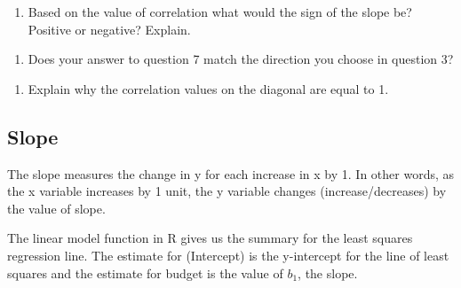 \documentclass[
]{report}
\newenvironment{Shaded}{\begin{snugshade}}{\end{snugshade}}
\newcommand{\CommentTok}[1]{\textcolor[rgb]{0.56,0.35,0.01}{\textit{#1}}}
\newcommand{\DataTypeTok}[1]{\textcolor[rgb]{0.13,0.29,0.53}{#1}}
\newcommand{\KeywordTok}[1]{\textcolor[rgb]{0.13,0.29,0.53}{\textbf{#1}}}
\newcommand{\NormalTok}[1]{#1}
\newcommand{\OperatorTok}[1]{\textcolor[rgb]{0.81,0.36,0.00}{\textbf{#1}}}
\newcommand{\StringTok}[1]{\textcolor[rgb]{0.31,0.60,0.02}{#1}}
\providecommand{\tightlist}{%
  \setlength{\itemsep}{0pt}\setlength{\parskip}{0pt}}
\begin{document}
\vspace{0.3in}

\begin{enumerate}
\def\labelenumi{\arabic{enumi}.}
\setcounter{enumi}{6}
\tightlist
\item
  Based on the value of correlation what would the sign of the slope be? Positive or negative? Explain.
\end{enumerate}

\vspace{1in}

\begin{enumerate}
\def\labelenumi{\arabic{enumi}.}
\setcounter{enumi}{7}
\tightlist
\item
  Does your answer to question 7 match the direction you choose in question 3?
\end{enumerate}

\vspace{0.3in}

\begin{enumerate}
\def\labelenumi{\arabic{enumi}.}
\setcounter{enumi}{8}
\tightlist
\item
  Explain why the correlation values on the diagonal are equal to 1.
\end{enumerate}

\vspace{1in}

\hypertarget{slope}{%
\subsection{Slope}\label{slope}}

The slope measures the change in y for each increase in x by 1. In other words, as the x variable increases by 1 unit, the y variable changes (increase/decreases) by the value of slope.

The linear model function in R gives us the summary for the least squares regression line. The estimate for (Intercept) is the y-intercept for the line of least squares and the estimate for budget is the value of \(b_1\), the slope.

\begin{Shaded}
\end{Shaded}
\end{document}
